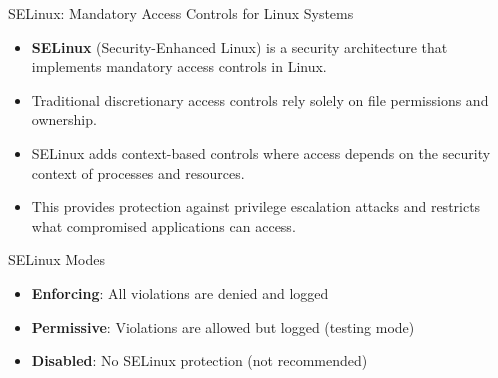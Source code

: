 \documentclass{beamer}
\begin{document}
            \begin{frame}{SELinux: Mandatory Access Controls for Linux Systems}
                \begin{itemize}
                    \item \textbf{SELinux} (Security-Enhanced Linux) is a security architecture that implements mandatory access controls in Linux.
                    \item Traditional discretionary access controls rely solely on file permissions and ownership.
                    \item SELinux adds context-based controls where access depends on the security context of processes and resources.
                    \item This provides protection against privilege escalation attacks and restricts what compromised applications can access.
                \end{itemize}
                
                \begin{alertblock}{SELinux Modes}
                \begin{itemize}
                    \item \textbf{Enforcing}: All violations are denied and logged
                    \item \textbf{Permissive}: Violations are allowed but logged (testing mode)
                    \item \textbf{Disabled}: No SELinux protection (not recommended)
                \end{itemize}
                \end{alertblock}
                \end{frame}
                
\end{document}
